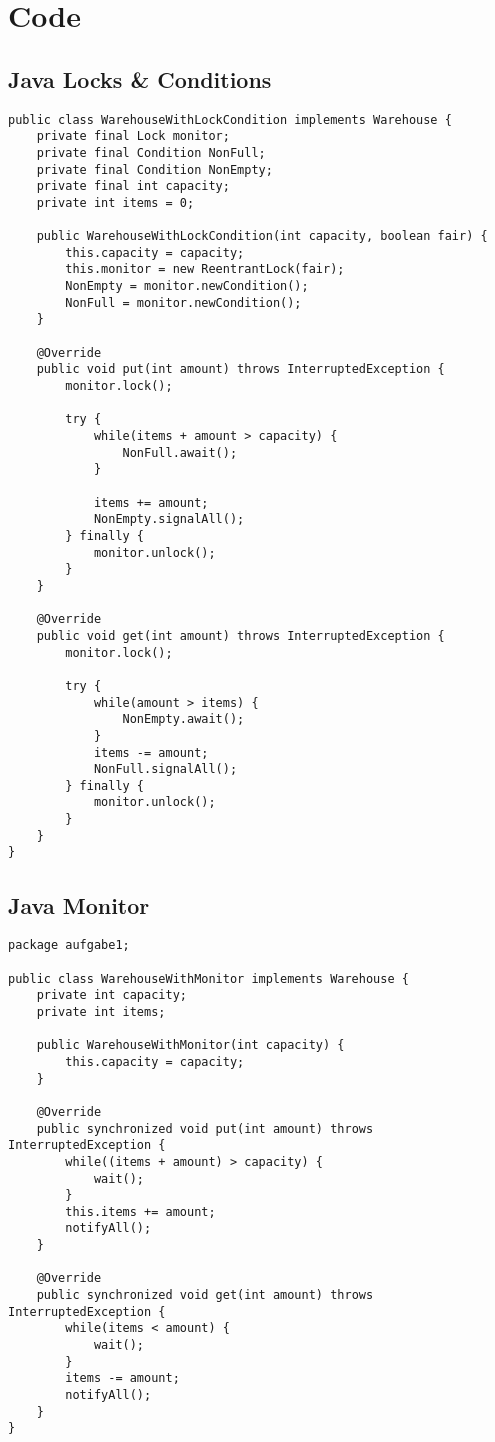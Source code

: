 \section{Code}
\subsection{Java Locks \& Conditions}

\begin{lstlisting}[style=csharp]
public class WarehouseWithLockCondition implements Warehouse {
	private final Lock monitor;
	private final Condition NonFull;
	private final Condition NonEmpty;
	private final int capacity;
	private int items = 0;

	public WarehouseWithLockCondition(int capacity, boolean fair) {
		this.capacity = capacity;
		this.monitor = new ReentrantLock(fair);
		NonEmpty = monitor.newCondition();
		NonFull = monitor.newCondition();
	}

	@Override
	public void put(int amount) throws InterruptedException {
		monitor.lock();

		try {
			while(items + amount > capacity) {
				NonFull.await();
			}

			items += amount;
			NonEmpty.signalAll();
		} finally {
			monitor.unlock();
		}
	}

	@Override
	public void get(int amount) throws InterruptedException {
		monitor.lock();

		try {
			while(amount > items) {
				NonEmpty.await();
			}
			items -= amount;
			NonFull.signalAll();
		} finally {
			monitor.unlock();
		}
	}
}
\end{lstlisting}

\subsection{Java Monitor}

\begin{lstlisting}[style=csharp]
package aufgabe1;

public class WarehouseWithMonitor implements Warehouse {
	private int capacity;
	private int items;

	public WarehouseWithMonitor(int capacity) {
		this.capacity = capacity;
	}

	@Override
	public synchronized void put(int amount) throws InterruptedException {
		while((items + amount) > capacity) {
			wait();
		}
		this.items += amount;
		notifyAll();
	}

	@Override
	public synchronized void get(int amount) throws InterruptedException {
		while(items < amount) {
			wait();
		}
		items -= amount;
		notifyAll();
	}
}
\end{lstlisting}

